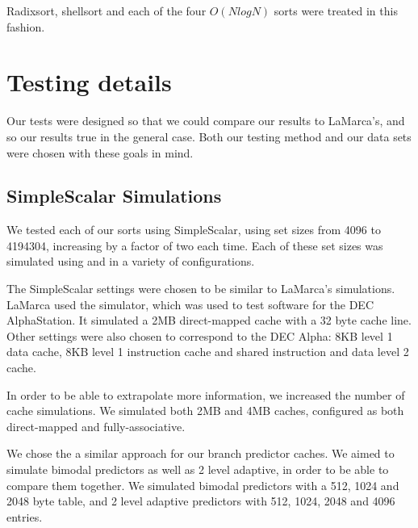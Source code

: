 Radixsort, shellsort and each of the four $O(NlogN)$ sorts were treated in this
fashion.

\section{Testing details}


Our tests were designed so that we could compare our results to LaMarca's, and
so our results true in the general case. Both our testing method and our data
sets were chosen with these goals in mind.

\subsection{SimpleScalar Simulations}

We tested each of our sorts using SimpleScalar, using set sizes from 4096 to
4194304, increasing by a factor of two each time. Each of these set sizes was
simulated using  and  in a variety of
configurations.

The SimpleScalar settings were chosen to be similar to LaMarca's simulations.
LaMarca used the  simulator, which was used to test software for the DEC
AlphaStation. It simulated a 2MB direct-mapped cache with a 32 byte cache line.
Other settings were also chosen to correspond to the DEC Alpha: 8KB level 1 data
cache, 8KB level 1 instruction cache and shared instruction and data level 2
cache.

In order to be able to extrapolate more information, we increased the number of
cache simulations. We simulated both 2MB and 4MB caches, configured as both
direct-mapped and fully-associative.

We chose the a similar approach for our branch predictor caches. We aimed to
simulate bimodal predictors as well as 2 level adaptive, in order to be able to
compare them together. We simulated bimodal predictors with a 512, 1024 and
2048 byte table, and 2 level adaptive predictors with 512, 1024, 2048 and 4096
entries.

